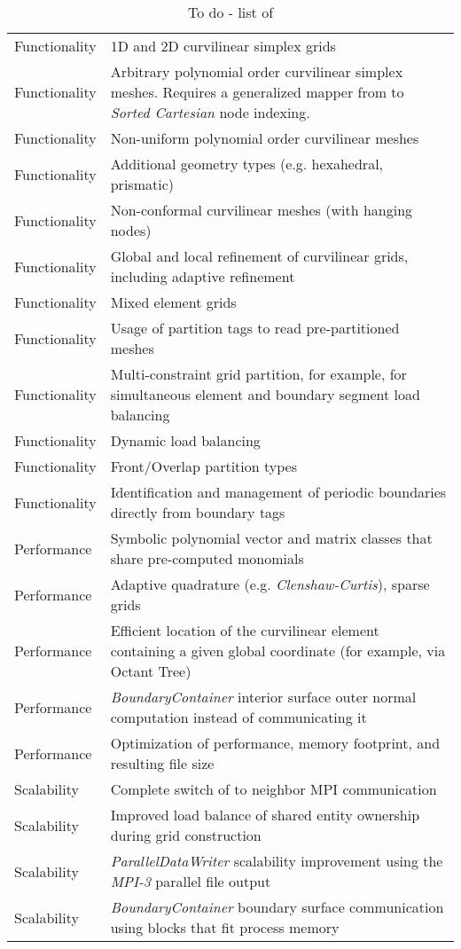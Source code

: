 \begin{flushleft}
\begin{table}
\begin{tabularx}{\textwidth}{@{}| l X |@{}}
\hline
Functionality & 1D and 2D curvilinear simplex grids \\
Functionality & Arbitrary polynomial order curvilinear simplex meshes. Requires a generalized mapper from \gmsh{} to \textit{Sorted Cartesian} node indexing. \\
Functionality & Non-uniform polynomial order curvilinear meshes \\
Functionality & Additional geometry types (e.g. hexahedral, prismatic) \\
Functionality & Non-conformal curvilinear meshes (with hanging nodes) \\
Functionality & Global and local refinement of curvilinear grids, including adaptive refinement \\
Functionality & Mixed element grids \\
Functionality & Usage of \gmsh{} partition tags to read pre-partitioned meshes \\
Functionality & Multi-constraint grid partition, for example, for simultaneous element and boundary segment load balancing \\
Functionality & Dynamic load balancing \\
Functionality & Front/Overlap partition types \\
Functionality & Identification and management of periodic boundaries directly from boundary tags \\
Performance & Symbolic polynomial vector and matrix classes that share pre-computed monomials \\
Performance & Adaptive quadrature (e.g. \textit{Clenshaw-Curtis}), sparse grids \cite{petras2000} \\
Performance & Efficient location of the curvilinear element containing a given global coordinate (for example, via Octant Tree) \\
Performance & \textit{BoundaryContainer} interior surface outer normal computation instead of communicating it  \\
Performance & Optimization of \curvwriter{} performance, memory footprint, and resulting file size	 \\
Scalability & Complete switch of \curvgrid{} to neighbor MPI communication \\
Scalability & Improved load balance of shared entity ownership during grid construction \\
Scalability & \textit{ParallelDataWriter} scalability improvement using the \textit{MPI-3} parallel file output  \\
Scalability & \textit{BoundaryContainer} boundary surface communication using blocks that fit process memory \\
\hline
\end{tabularx}
\caption{To do - list of \curvgrid{}}
\label{table:conclusion:todolist}
\end{table}
\end{flushleft}



